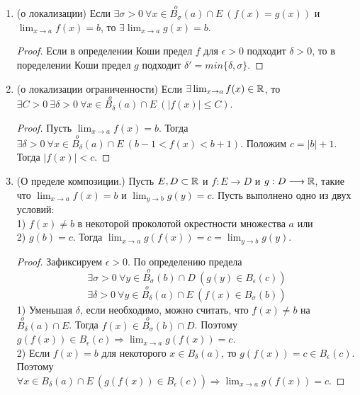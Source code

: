 \begin{enumerate}
    Заключение следует понимать так: если существует величина справа, то существует величина слева и они равны.
    \begin{proof}
        Рассмотрим произвольную последовательность $\{x_{n}\} \in E$ с условиями $x_{n} \to a$ и $x_{n} \neq a$. Тогда $f(x_{n}) \to b$ и $g(x_{n}) \to c$. По свойствам предела последовательности $f(x_{n}) \pm g(x_{n}) \to b \pm c$, $f(x_{n}) \cdot g(x_{n}) \to b \cdot c$, $\frac{f(x_{n})}{g(x_{n})} \to \frac{b}{c}$. Осталось воспользоваться определением предела по Гейне.
    \end{proof}
    \item (о локализации) Если $\exists \sigma > 0 \ \forall x \in \overset{o}{B_{\sigma}}(a) \cap E \ (f(x) = g(x))$ и $\lim_{x \rightarrow a} f(x) = b$, то $\exists \lim_{x \rightarrow a} g(x) = b$.
    \begin{proof}
        Если в определении Коши предел $f$ для $\epsilon > 0$ подходит $\delta > 0$, то в поределении Коши предел $g$ подходит $\delta' = min\{\delta, \sigma\}$.
    \end{proof}
    \item (о локализации ограниченности) Если $\exists \lim_{x \rightarrow a} f(x) \in \mathbb{R}$, то $\exists C > 0 \ \exists \delta > 0 \ \forall x \in \overset{o}{B_{\delta}}(a) \cap E \ (|f(x)| \leq C)$.
    \begin{proof}
        Пусть $\lim_{x \rightarrow a} f(x) = b$. Тогда $\exists \delta > 0 \ \forall x \in \overset{o}{B_{\delta}}(a) \cap E \ (b - 1 < f(x) < b + 1)$. Положим $c = |b| + 1$. Тогда $|f(x)| < c$.
    \end{proof}
    \item (О пределе композиции.) Пусть $E, D \subset \mathbb{R}$ и $f: E \longrightarrow D$ и $g: D \longrightarrow \mathbb{R}$, такие что $\lim_{x \rightarrow a} f(x) = b$ и $\lim_{y \rightarrow b} g(y) = c$. Пусть выполнено одно из двух условий: 
    \\
    1) $f(x) \neq b$ в некоторой проколотой окрестности множества $a$ или 
    \\
    2) $g(b) = c$. Тогда $\lim_{x \rightarrow a} g(f(x)) = c = \lim_{y \rightarrow b} g(y)$.
    \begin{proof}
        Зафиксируем $\epsilon > 0$. По определению предела
        \[\exists \sigma > 0 \ \forall y \in \overset{o}{B_{\sigma}}(b) \cap D \ (g(y) \in \overset{}{B_{\epsilon}}(c))\]
        \[\exists \delta > 0 \ \forall y \in \overset{o}{B_{\delta}}(a) \cap E \ (f(x) \in \overset{}{B_{\sigma}}(b))\]
        1) Уменьшая $\delta$, если необходимо, можно считать, что $f(x) \neq b$ на $\overset{o}{B_{\delta}}(a) \cap E$. Тогда $f(x) \in \overset{o}{B_{\sigma}}(b) \cap D$. Поэтому $g(f(x)) \in \overset{}{B_{\epsilon}}(c) \Rightarrow \lim_{x \rightarrow a} g(f(x)) = c$.
        \\
        2) Если $f(x) = b$ для некоторого $x \in \overset{}{B_{\delta}}(a)$, то $g(f(x)) = c \in \overset{}{B_{\epsilon}}(c)$. Поэтому $\forall x \in \overset{}{B_{\delta}}(a) \cap E \ (g(f(x)) \in \overset{}{B_{\epsilon}}(c)) \Rightarrow \lim_{x \rightarrow a} g(f(x)) = c$.
    \end{proof}
\end{enumerate}

